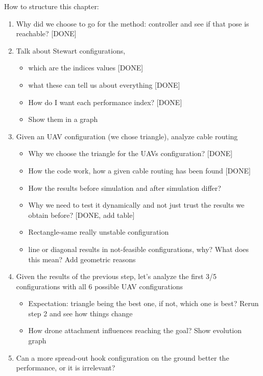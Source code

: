 How to structure this chapter:
\begin{enumerate}
    \item Why did we choose to go for the method: controller and see if that pose is reachable? [DONE] 
    \item Talk about Stewart configurations, 
    \begin{itemize}
        \item which are the indices values [DONE]
        \item what these can tell us about everything [DONE]
        \item How do I want each performance index? [DONE]
        \item Show them in a graph
    \end{itemize}
    \item Given an UAV configuration (we chose triangle), analyze cable routing
    \begin{itemize}
        \item Why we choose the triangle for the UAVs configuration? [DONE]
        \item How the code work, how a given cable routing has been found [DONE]
        \item How the results before simulation and after simulation differ?
        \item Why we need to test it dynamically and not just trust the results we obtain before? [DONE, add table]
        \item Rectangle-same really unstable configuration
        \item line or diagonal results in not-feasible configurations, why? What does this mean? Add geometric reasons
    \end{itemize}
    \item Given the results of the previous step, let's analyze the first 3/5 configurations with all 6 possible UAV configurations
    \begin{itemize}
        \item Expectation: triangle being the best one, if not, which one is best? Rerun step 2 and see how things change
        \item How drone attachment influences reaching the goal? Show evolution graph
    \end{itemize}
    \item Can a more spread-out hook configuration on the ground better the performance, or it is irrelevant? 

\end{enumerate}
